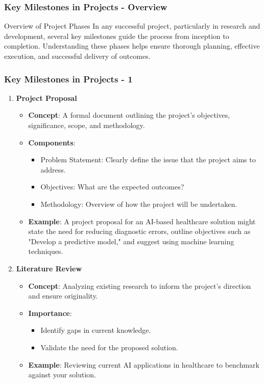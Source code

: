 \documentclass{beamer}
\begin{document}
\begin{frame}[fragile]
    \frametitle{Key Milestones in Projects - Overview}
    \begin{block}{Overview of Project Phases}
        In any successful project, particularly in research and development, several key milestones guide the process from inception to completion. Understanding these phases helps ensure thorough planning, effective execution, and successful delivery of outcomes.
    \end{block}
\end{frame}

\begin{frame}[fragile]
    \frametitle{Key Milestones in Projects - 1}
    \begin{enumerate}
        \item \textbf{Project Proposal}
            \begin{itemize}
                \item \textbf{Concept}: A formal document outlining the project's objectives, significance, scope, and methodology.
                \item \textbf{Components}:
                \begin{itemize}
                    \item Problem Statement: Clearly define the issue that the project aims to address.
                    \item Objectives: What are the expected outcomes?
                    \item Methodology: Overview of how the project will be undertaken.
                \end{itemize}
                \item \textbf{Example}: A project proposal for an AI-based healthcare solution might state the need for reducing diagnostic errors, outline objectives such as "Develop a predictive model," and suggest using machine learning techniques.
            \end{itemize}
        \item \textbf{Literature Review}
            \begin{itemize}
                \item \textbf{Concept}: Analyzing existing research to inform the project's direction and ensure originality.
                \item \textbf{Importance}:
                \begin{itemize}
                    \item Identify gaps in current knowledge.
                    \item Validate the need for the proposed solution.
                \end{itemize}
                \item \textbf{Example}: Reviewing current AI applications in healthcare to benchmark against your solution.
            \end{itemize}
    \end{enumerate}
\end{frame}
\end{document}
